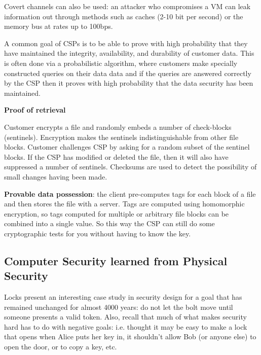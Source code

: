 \documentclass[../notes.tex]{subfiles}
\begin{document}
Covert channels can also be used: an attacker who compromises a VM can leak information out through methods such as caches (2-10 bit per second) or the memory bus at rates up to 100bps.


A common goal of CSPs is to be able to prove with high probability that they have maintained the integrity, availability, and durability of customer data. This is often done via a probabilistic algorithm, where customers make specially constructed queries on their data data and if the queries are answered correctly by the CSP then it proves with high probability that the data security has been maintained.


\begin{definition}
    \textbf{Proof of retrieval} 

    Customer encrypts a file and randomly embeds a number of check-blocks (sentinels). Encryption makes the sentinels indistinguishable from other file blocks.
    Customer challenges CSP by asking for a random subset of the sentinel blocks. If the CSP has modified or deleted the file, then it will also have suppressed a number of sentinels.
    Checksums are used to detect the possibility of small changes having been made.
\end{definition}


\begin{definition}
    \textbf{Provable data possession}: the client pre-computes tags for each block of a file and then stores the file with a server. Tags are computed using homomorphic encryption, so tags computed for multiple or arbitrary file blocks can be combined into a single value. So this way the CSP can still do some cryptographic tests for you without having to know the key.
\end{definition}


\subsection{Computer Security learned from Physical Security}


Locks present an interesting case study in security design for a goal that has remained unchanged for almost 4000 years: do not let the bolt move until someone presents a valid token.
Also, recall that much of what makes security hard has to do with negative goals: i.e. thought it may be easy to make a lock that opens when Alice puts her key in, it shouldn't allow Bob (or anyone else) to open the door, or to copy a key, etc.
\end{document}
